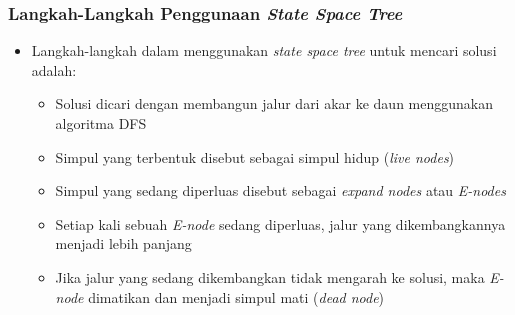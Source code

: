 \documentclass{beamer}
\begin{document}
\begin{frame}
\frametitle{Langkah-Langkah Penggunaan \protect\textit{State Space Tree}}
\begin{itemize}
\item Langkah-langkah dalam menggunakan \textit{state space tree} untuk mencari solusi adalah:
\begin{itemize}
	\item Solusi dicari dengan membangun jalur dari akar ke daun menggunakan algoritma DFS
	\item Simpul yang terbentuk disebut sebagai simpul hidup (\textit{live nodes})
	\item Simpul yang sedang diperluas disebut sebagai \textit{expand nodes} atau \textit{E-nodes}
	\item Setiap kali sebuah \textit{E-node} sedang diperluas, jalur yang dikembangkannya menjadi lebih panjang
	\item Jika jalur yang sedang dikembangkan tidak mengarah ke solusi, maka \textit{E-node} dimatikan dan menjadi simpul mati (\textit{dead node})
	\end{itemize}
\end{itemize}
\end{frame}

\end{document}
